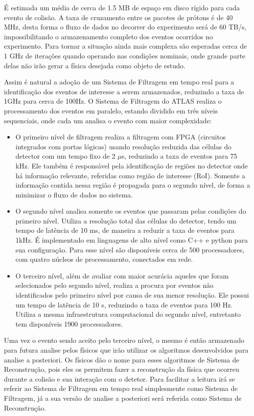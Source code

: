 É estimada um média de cerca de 1.5 MB de espaço em disco rígido para cada evento de 
colisão. A taxa de cruzamento entre os pacotes de prótons é de 40 MHz, 
desta forma o fluxo de dados no decorrer do experimento será de 60 TB/s, impossibilitando o
armazenamento completo dos eventos ocorridos no experimento. Para tornar a
situação ainda mais complexa são esperadas cerca de 1 GHz de iterações quando
operando nas condições nominais, onde grande parte delas não irão gerar a física
desejada como objeto de estudo.

Assim é natural a adoção de um Sistema de Filtragem em tempo real para a
identificação dos eventos de interesse a serem armazenados, reduzindo a taxa de 1GHz
para cerca de 100Hz. O Sistema de Filtragem do ATLAS realiza o processamento dos 
eventos em paralelo, estando dividido em três níveis sequenciais, onde cada um 
analisa o evento com maior complexidade:

\begin{itemize}
\item O primeiro nível de filtragem realiza a filtragem com FPGA (circuitos
integrados com portas lógicas) usando resolução reduzida das células do detector
com um tempo fixo de 2 $\mu$s, reduzindo a taxa de eventos para
75 kHz. Ele também é responsável pela identificação de regiões no detector onde
há informação relevante, referidas como região de interesse (RoI). Somente a
informação contida nessa região é propagada para o segundo nível, de forma a
minimizar o fluxo de dados no sistema.
\item O segundo nível analisa somente os eventos que passaram pelas condições do
primeiro nível. Utiliza a resolução total das células do detector, 
tendo um tempo de latência de 10 ms, de maneira a reduzir a taxa de eventos para
1kHz. É implementado em linguagens de alto nível como C++ e python para sua configuração. 
Para esse nível são disponíveis cerca de 500 processadores, com quatro
núcleos de processamento, conectados em rede.
\item O terceiro nível, além de avaliar com maior acurácia aqueles que foram
selecionados pelo segundo nível, realiza a procura por eventos não identificados pelo
primeiro nível por causa de sua menor resolução. Ele possui um tempo de 
latência de 10 s, reduzindo a taxa de eventos para 100 Hz. Utiliza a mesma
infraestrutura computacional do segundo nível, entretanto tem disponíveis 1900 processadores.
\end{itemize}

Uma vez o evento sendo aceito pelo terceiro nível, o mesmo é então armazenado
para futura analise pelos físicos que irão utilizar os algoritmos desenvolvidos 
para analise a posteriori. Os físicos dão o nome para esses algoritmos de Sistema de
Reconstrução, pois eles os permitem fazer a reconstrução da física que ocorreu
durante a colisão e sua interação com o detetor. Para facilitar a leitura irá se 
referir ao Sistema de Filtragem em tempo real simplesmente como Sistema de 
Filtragem, já a sua versão de analise a posteriori será referida como Sistema de Reconstrução.

